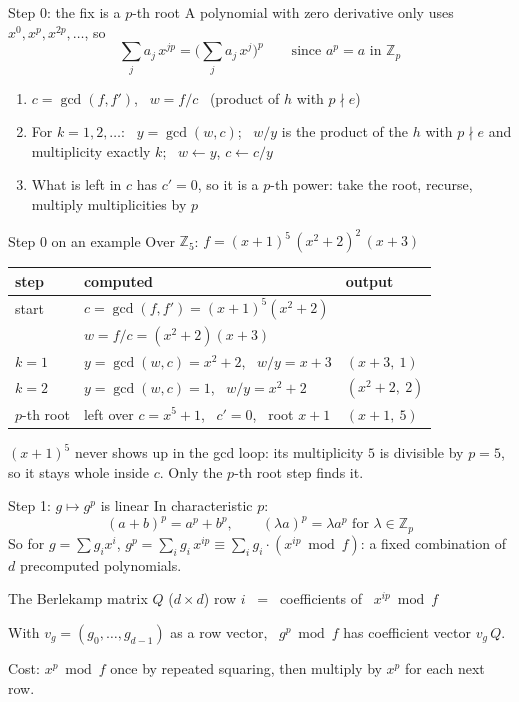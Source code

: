 \documentclass[aspectratio=169,11pt]{beamer}
\newcommand{\Zp}{\mathbb{Z}_p}
\newcommand{\aside}[1]{{\color{muted}\small #1}}
\begin{document}
\begin{frame}{Step 0: the fix is a $p$-th root}
  A polynomial with zero derivative only uses $x^0, x^p, x^{2p}, \dots$, so
  \[ \sum_j a_j\, x^{jp} = \Big(\sum_j a_j\, x^j\Big)^p \qquad \text{since } a^p = a \text{ in } \Zp \]
  \medskip
  \begin{enumerate}
    \item $c = \gcd(f, f')$, \ $w = f / c$ \ (product of $h$ with $p \nmid e$)
    \item For $k = 1, 2, \dots$: \ $y = \gcd(w, c)$; \ $w / y$ is the product of the $h$ with $p \nmid e$ and multiplicity exactly $k$; \ $w \leftarrow y$, $c \leftarrow c / y$
    \item What is left in $c$ has $c' = 0$, so it is a $p$-th power: take the root, recurse, multiply multiplicities by $p$
  \end{enumerate}
\end{frame}

\begin{frame}{Step 0 on an example}
  Over $\mathbb{Z}_5$: \quad $f = (x+1)^5\,(x^2+2)^2\,(x+3)$
  \bigskip
  \begin{center}
  \begin{tabular}{@{}lll@{}}
    \toprule
    step & computed & output \\
    \midrule
    start & $c = \gcd(f, f') = (x+1)^5 (x^2+2)$ & \\
          & $w = f/c = (x^2+2)(x+3)$ & \\
    $k = 1$ & $y = \gcd(w, c) = x^2 + 2$, \ $w / y = x + 3$ & $(x + 3,\ 1)$ \\
    $k = 2$ & $y = \gcd(w, c) = 1$, \ $w / y = x^2 + 2$ & $(x^2 + 2,\ 2)$ \\
    $p$-th root & left over $c = x^5 + 1$, \ $c' = 0$, \ root $x + 1$ & $(x + 1,\ 5)$ \\
    \bottomrule
  \end{tabular}
  \end{center}
  \bigskip
  \aside{$(x+1)^5$ never shows up in the gcd loop: its multiplicity $5$ is divisible by $p = 5$, so it stays whole inside $c$. Only the $p$-th root step finds it.}
\end{frame}

\begin{frame}{Step 1: $g \mapsto g^p$ is linear}
  In characteristic $p$:
  \[ (a + b)^p = a^p + b^p, \qquad (\lambda a)^p = \lambda a^p \text{ for } \lambda \in \Zp \]
  So for $g = \sum g_i x^i$, \quad $g^p = \sum_i g_i\, x^{ip} \equiv \sum_i g_i \cdot (x^{ip} \bmod f)$:
  a fixed combination of $d$ precomputed polynomials.
  \bigskip
  \begin{block}{The Berlekamp matrix $Q$ \quad ($d \times d$)}
    \centering row $i$ \ = \ coefficients of \ $x^{ip} \bmod f$
  \end{block}
  \bigskip
  With $v_g = (g_0, \dots, g_{d-1})$ as a row vector, \ $g^p \bmod f$ has coefficient vector $v_g\, Q$.\par
  \aside{Cost: $x^p \bmod f$ once by repeated squaring, then multiply by $x^p$ for each next row.}
\end{frame}
\end{document}
